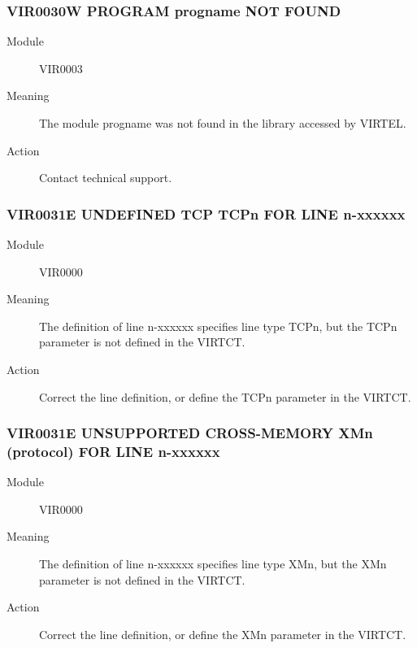 \documentclass[letterpaper,10pt,english]{sphinxmanual}
\begin{document}
\subsubsection{VIR0030W PROGRAM progname NOT FOUND}
\label{\detokenize{messages:vir0030w-program-progname-not-found}}\begin{description}
\item[{Module}] \leavevmode
VIR0003

\item[{Meaning}] \leavevmode
The module progname was not found in the library accessed by VIRTEL.

\item[{Action}] \leavevmode
Contact technical support.

\end{description}


\subsubsection{VIR0031E UNDEFINED TCP TCPn FOR LINE n-xxxxxx}
\label{\detokenize{messages:vir0031e-undefined-tcp-tcpn-for-line-n-xxxxxx}}\begin{description}
\item[{Module}] \leavevmode
VIR0000

\item[{Meaning}] \leavevmode
The definition of line n-xxxxxx specifies line type TCPn, but the TCPn parameter is not defined in the VIRTCT.

\item[{Action}] \leavevmode
Correct the line definition, or define the TCPn parameter in the VIRTCT.

\end{description}


\subsubsection{VIR0031E UNSUPPORTED CROSS-MEMORY XMn (protocol) FOR LINE n-xxxxxx}
\label{\detokenize{messages:vir0031e-unsupported-cross-memory-xmn-protocol-for-line-n-xxxxxx}}\begin{description}
\item[{Module}] \leavevmode
VIR0000

\item[{Meaning}] \leavevmode
The definition of line n-xxxxxx specifies line type XMn, but the XMn parameter is not defined in the VIRTCT.

\item[{Action}] \leavevmode
Correct the line definition, or define the XMn parameter in the VIRTCT.

\end{description}
\end{document}
